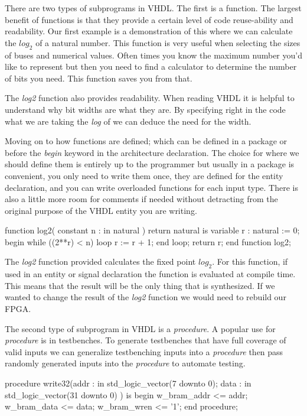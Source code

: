 There are two types of subprograms in \ac{VHDL}. The first is a function. The largest benefit of functions is that they provide a certain level of code reuse-ability and readability. Our first example is a demonstration of this where we can calculate the $log_2$ of a natural number. This function is very useful when selecting the sizes of buses and numerical values. Often times you know the maximum number you'd like to represent but then you need to find a calculator to determine the number of bits you need. This function saves you from that. 

The \emph{log2} function also provides readability. When reading \ac{VHDL} it is helpful to understand why bit widths are what they are. By specifying right in the code what we are taking the \emph{log} of we can deduce the need for the width. 

Moving on to how functions are defined; which can be defined in a package or before the \emph{begin} keyword in the architecture declaration. The choice for where we should define them is entirely up to the programmer but usually in a package is convenient, you only need to write them once, they are defined for the entity declaration, and you can write overloaded functions for each input type. There is also a little more room for comments if needed without detracting from the original purpose of the \ac{VHDL} entity you are writing. 
	
\begin{VHDLlisting}[tabsize=4]
function log2(
    constant n : in natural
) return natural is
    variable r : natural := 0;
begin
    while ((2**r) < n) loop
        r := r + 1;
    end loop;
    return r;
end function log2;
\end{VHDLlisting}

The \emph{log2} function provided calculates the fixed point $log_2$. For this function, if used in an entity or signal declaration the function is evaluated at compile time. This means that the result will be the only thing that is synthesized. If we wanted to change the result of the \emph{log2} function we would need to rebuild our \ac{FPGA}. 

The second type of subprogram in \ac{VHDL} is a \emph{procedure}. A popular use for \emph{procedure} is in testbenches. To generate testbenches that have full coverage of valid inputs we can generalize testbenching inputs into a \emph{procedure} then pass randomly generated inputs into the \emph{procedure} to automate testing. 

\begin{VHDLlisting}[tabsize=4]
procedure write32(addr : in std_logic_vector(7 downto 0);
                  data : in std_logic_vector(31 downto 0) ) is
begin
    w_bram_addr <= addr;
    w_bram_data <= data;
    w_bram_wren <= '1';
end procedure;
\end{VHDLlisting}


